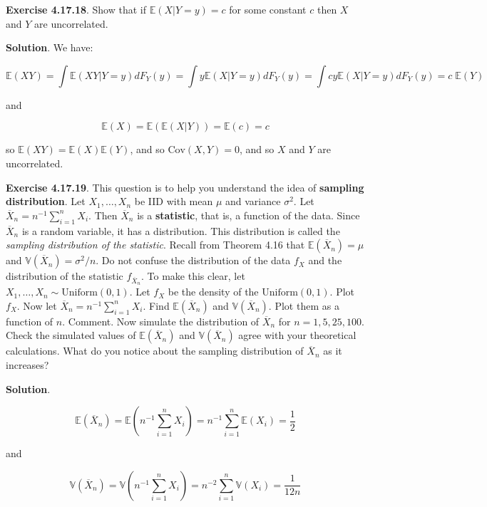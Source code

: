 \textbf{Exercise 4.17.18}. Show that if $\mathbb{E}(X |{} Y = y)
= c $ for some constant \(c\) then \(X\) and \(Y\) are uncorrelated.

\textbf{Solution}. We have:

\[ \mathbb{E}(XY) = \int \mathbb{E}(XY | Y = y) dF_Y(y) = \int y \mathbb{E}(X | Y = y) dF_Y(y) = \int cy \mathbb{E}(X | Y = y) dF_Y(y) = c \; \mathbb{E}(Y)\]

and

\[ \mathbb{E}(X) = \mathbb{E}(\mathbb{E}(X | Y)) = \mathbb{E}(c) = c \]

so \(\mathbb{E}(XY) = \mathbb{E}(X) \mathbb{E}(Y)\), and so
\(\text{Cov}(X, Y) = 0\), and so \(X\) and \(Y\) are uncorrelated.

\textbf{Exercise 4.17.19}. This question is to help you understand the
idea of \textbf{sampling distribution}. Let \(X_{1}, \dots, X_{n}\) be IID
with mean \(\mu\) and variance \(\sigma^{2}\). Let
\(\overline{X}_{n}  = n^{-1}\sum_{i=1}^{n} X_{i}\). Then \(\overline{X}_{n}\) is
a \textbf{statistic}, that is, a function of the data. Since
\(\overline{X}_{n}\) is a random variable, it has a distribution. This
distribution is called the \emph{sampling distribution of the
statistic}. Recall from Theorem 4.16 that
\(\mathbb{E}(\overline{X}_{n}) = \mu\) and
\(\mathbb{V}(\overline{X}_{n}) = \sigma^{2} / n\). Do not confuse the
distribution of the data \(f_X\) and the distribution of the statistic
\(f_{\overline{X}_{n}}\). To make this clear, let
\(X_{1}, \dots, X_{n} \sim \text{Uniform}(0, 1)\). Let \(f_X\) be the
density of the \(\text{Uniform}(0, 1)\). Plot \(f_X\). Now let
\(\overline{X}_{n} = n^{-1} \sum_{i=1}^{n} X_{i}\). Find
\(\mathbb{E}(\overline{X}_{n})\) and \(\mathbb{V}(\overline{X}_{n})\). Plot
them as a function of \(n\). Comment. Now simulate the distribution of
\(\overline{X}_{n}\) for \(n = 1, 5, 25, 100\). Check the simulated values
of \(\mathbb{E}(\overline{X}_{n})\) and \(\mathbb{V}(\overline{X}_{n})\)
agree with your theoretical calculations. What do you notice about the
sampling distribution of \(\overline{X}_{n}\) as it increases?

\textbf{Solution}.

\[ \mathbb{E}\left(\overline{X}_{n}\right) = \mathbb{E}\left(n^{-1} \sum_{i=1}^{n} X_{i} \right) = n^{-1} \sum_{i=1}^{n} \mathbb{E}(X_{i}) = \frac{1}{2} \]

and

\[ \mathbb{V}\left(\overline{X}_{n}\right) = \mathbb{V}\left(n^{-1} \sum_{i=1}^{n} X_{i} \right) = n^{-2} \sum_{i=1}^{n} \mathbb{V}(X_{i}) = \frac{1}{12 n} \]

